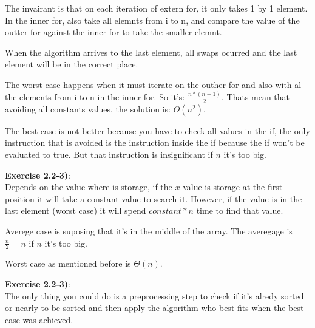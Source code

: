\documentclass{article}
\newcounter{exercise}[section]   %
\begin{document}
The invairant is that on each iteration of extern for, it only takes 1 by 1 element. In the
inner for, also take all elemnts from i to n, and compare the value of the outter for
against the inner for to take the smaller elemnt.

When the algorithm arrives to the last element, all swaps ocurred and the last element will
be in the correct place.

The worst case happens when it must iterate on the outher for and also with al the elements
from i to n in the inner for. So it's: \(\frac{n*(n - 1)}{2}\). Thats mean that avoiding all
constants values, the solution is: \(\Theta(n^2)\).

The best case is not better because you have to check all values in the if, the only instruction
that is avoided is the instruction inside the if because the if won't be evaluated to true.
But that instruction is insignificant if \(n\) it's too big.

\textbf{Exercise 2.2-3)}:\\
Depends on the value where is storage, if the \(x\) value is storage at the first position it
will take a constant value to search it. However, if the value is in the last element 
(worst case) it will spend \(constant * n\) time to find that value.

Averege case is suposing that it's in the middle of the array. The averegage is \(\frac{n}{2} = n\)
if \(n\) it's too big. 

Worst case as mentioned before is \(\Theta(n)\).

\textbf{Exercise 2.2-3)}:\\
The only thing you could do is a preprocessing step to check if it's alredy sorted or nearly
to be sorted and then apply the algorithm who best fits when the best case was achieved.
\end{document}
